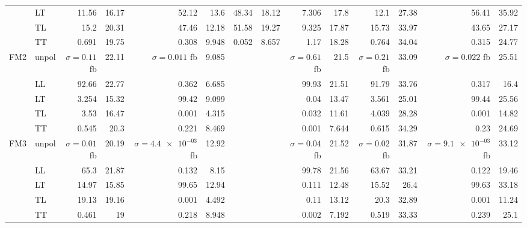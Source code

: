 \begin{table}[H]
{\begin{tabular}{llrrrrrrrrrrrr}
 & LT & \num{11.56} & \num{16.17} & \num{52.12} & \num{13.6} & \num{48.34} & \num{18.12} & \num{7.306} & \num{17.8} & \num{12.1} & \num{27.38} & \num{56.41} & \num{35.92} \\
 & TL & \num{15.2} & \num{20.31} & \num{47.46} & \num{12.18} & \num{51.58} & \num{19.27} & \num{9.325} & \num{17.87} & \num{15.73} & \num{33.97} & \num{43.65} & \num{27.17} \\
 & TT & \num{0.691} & \num{19.75} & \num{0.308} & \num{9.948} & \num{0.052} & \num{8.657} & \num{1.17} & \num{18.28} & \num{0.764} & \num{34.04} & \num{0.315} & \num{24.77} \\
\midrule
\multirow{5}{*}{FM2}
 & unpol & $\sigma = \num{0.11}$ fb & \num{22.11} & $\sigma = \num{0.011}$ fb & \num{9.085} &  &  & $\sigma = \num{0.61}$ fb & \num{21.5} & $\sigma = \num{0.21}$ fb & \num{33.09} & $\sigma = \num{0.022}$ fb & \num{25.51} \\
 & LL & \num{92.66} & \num{22.77} & \num{0.362} & \num{6.685} &  &  & \num{99.93} & \num{21.51} & \num{91.79} & \num{33.76} & \num{0.317} & \num{16.4} \\
 & LT & \num{3.254} & \num{15.32} & \num{99.42} & \num{9.099} &  &  & \num{0.04} & \num{13.47} & \num{3.561} & \num{25.01} & \num{99.44} & \num{25.56} \\
 & TL & \num{3.53} & \num{16.47} & \num{0.001} & \num{4.315} &  &  & \num{0.032} & \num{11.61} & \num{4.039} & \num{28.28} & \num{0.001} & \num{14.82} \\
 & TT & \num{0.545} & \num{20.3} & \num{0.221} & \num{8.469} &  &  & \num{0.001} & \num{7.644} & \num{0.615} & \num{34.29} & \num{0.23} & \num{24.69} \\
\midrule
\multirow{5}{*}{FM3}
 & unpol & $\sigma = \num{0.01}$ fb & \num{20.19} & $\sigma = \num{4.4e-03}$ fb & \num{12.92} &  &  & $\sigma = \num{0.04}$ fb & \num{21.52} & $\sigma = \num{0.02}$ fb & \num{31.87} & $\sigma = \num{9.1e-03}$ fb & \num{33.12} \\
 & LL & \num{65.3} & \num{21.87} & \num{0.132} & \num{8.15} &  &  & \num{99.78} & \num{21.56} & \num{63.67} & \num{33.21} & \num{0.122} & \num{19.46} \\
 & LT & \num{14.97} & \num{15.85} & \num{99.65} & \num{12.94} &  &  & \num{0.111} & \num{12.48} & \num{15.52} & \num{26.4} & \num{99.63} & \num{33.18} \\
 & TL & \num{19.13} & \num{19.16} & \num{0.001} & \num{4.492} &  &  & \num{0.11} & \num{13.12} & \num{20.3} & \num{32.89} & \num{0.001} & \num{11.24} \\
 & TT & \num{0.461} & \num{19} & \num{0.218} & \num{8.948} &  &  & \num{0.002} & \num{7.192} & \num{0.519} & \num{33.33} & \num{0.239} & \num{25.1} \\

\end{tabular}}
\end{table}
